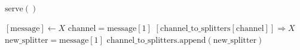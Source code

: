 \documentclass{article}
\begin{document}
\pagestyle{empty}

\newcommand{\send}{\Rightarrow}
\newcommand{\sendto}{\rightarrow}
\newcommand{\recv}{\Leftarrow}
\algrenewcommand\textproc{\textrm}

\begin{algorithmic}

  \algrenewcommand{}
  
  \State $\text{serve}()$
  \EndFunction
  
  \algrenewcommand{}
  \State $[\text{message}] \gets X$
  \State $\text{channel} = \text{message}[1]$
  \State $[\text{channel\_to\_splitters}[\text{channel}]] \send X$
  \Else {}
  \State $\text{new\_splitter} = \text{message}[1]$
  \State $\text{channel\_to\_splitters}.\text{append}(\text{new\_splitter})$
  \EndIf
  \EndIf
  \EndWhile
  \EndProcedure

  \EndProcedure
\end{algorithmic}
\end{document}
